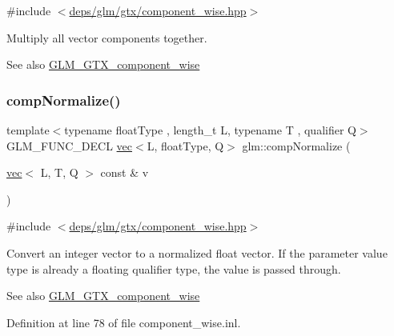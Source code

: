 {\ttfamily \#include $<$\hyperlink{component__wise_8hpp}{deps/glm/gtx/component\+\_\+wise.\+hpp}$>$}

Multiply all vector components together. \begin{DoxySeeAlso}{See also}
\hyperlink{group__gtx__component__wise}{G\+L\+M\+\_\+\+G\+T\+X\+\_\+component\+\_\+wise} 
\end{DoxySeeAlso}
\mbox{\label{group__gtx__component__wise_ga8f2b81ada8515875e58cb1667b6b9908}} 
\subsubsection{\texorpdfstring{comp\+Normalize()}{compNormalize()}}
{\footnotesize\ttfamily template$<$typename float\+Type , length\+\_\+t L, typename T , qualifier Q$>$ \\
G\+L\+M\+\_\+\+F\+U\+N\+C\+\_\+\+D\+E\+CL \hyperlink{structglm_1_1vec}{vec}$<$L, float\+Type, Q$>$ glm\+::comp\+Normalize (\begin{DoxyParamCaption}\item[{\hyperlink{structglm_1_1vec}{vec}$<$ L, T, Q $>$ const \&}]{v }\end{DoxyParamCaption})}



{\ttfamily \#include $<$\hyperlink{component__wise_8hpp}{deps/glm/gtx/component\+\_\+wise.\+hpp}$>$}

Convert an integer vector to a normalized float vector. If the parameter value type is already a floating qualifier type, the value is passed through. \begin{DoxySeeAlso}{See also}
\hyperlink{group__gtx__component__wise}{G\+L\+M\+\_\+\+G\+T\+X\+\_\+component\+\_\+wise} 
\end{DoxySeeAlso}


Definition at line 78 of file component\+\_\+wise.\+inl.

\mbox{\label{group__gtx__component__wise_ga80abc2980d65d675f435d178c36880eb}} 
